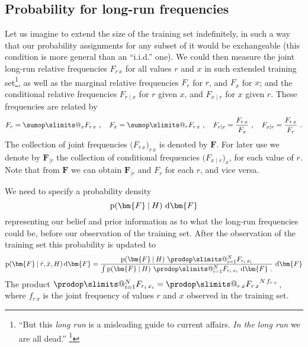 \documentclass[\ifafour a4paper,12pt,\else a5paper,10pt,\fi%
onecolumn,oneside,article,%
british%
]{memoir}
\makeatletter
\theoremstyle{remark}
\theoremstyle{innote}
\def\sum{\DOTSI\sumop\slimits@}
\def\prod{\DOTSI\prodop\slimits@}
\newcommand*{\citep}{\footcites}
\newcommand*{\di}{\mathrm{d}}%
\newcommand*{\p}{\mathrm{p}}%
\renewcommand*{\|}[1][]{\nonscript\:#1\vert\nonscript\:\mathopen{}}
\renewcommand*{\=}{\TextOrMath\texteq\eq}
\newcommand*{\sect}{\S}%
\newcommand*{\q}{}%
\DeclareRobustCommand*{\q}{%
  \mathord{\mathpalette\bigcdot@{}}%
}
\newcommand*{\bigcdot@scalefactor}{0.7}
\newcommand*{\bigcdot@widthfactor}{1.5}
\newcommand*{\bigcdot@}[2]{%
  \sbox0{$#1\vcenter{}$}%
  \sbox2{$#1\cdot\m@th$}%
  \hbox to \bigcdot@widthfactor\wd2{%
    \hfil
    \raise\ht0\hbox{%
      \scalebox{\bigcdot@scalefactor}{%
        \lower\ht0\hbox{$#1\bullet\m@th$}%
      }%
    }%
    \hfil
  }%
}
\newcommand*{\rd}{\bar{r}}
\newcommand*{\xd}{\bar{x}}
\newcommand*{\yF}{\bm{F}}
\newcommand*{\yFr}{\yF_{\bm{\mid}r}}
\makeatother
\begin{document}
\subsection{Probability for long-run frequencies}
\label{sec:prob_longrun}

Let us imagine to extend the size of the training set indefinitely, in such
a way that our probability assignments for any subset of it would be
exchangeable (this condition is more general than an \enquote{i.i.d.} one).
We could then measure the joint long-run relative frequencies $F_{r\,x}$
for all values $r$ and $x$ in such extended training
set\footnote{\enquote{But this \emph{long run} is a misleading guide to
    current affairs. \emph{In the long run} we are all dead.}
  \citep[\sect~3.I, p.~65]{keynes1923_r2013}}, as well as the marginal
relative frequencies $F_{r\q}$ for $r$, and $F_{\q x}$ for $x$; and the
conditional relative frequencies $F_{r\mid x}$ for $r$ given $x$, and
$F_{x \mid r}$ for $x$ given $r$. These frequencies are related by
\begin{equation}
  \label{eq:frequencies_relations}
  F_{r\q}=\sum_{x} F_{r\,x}\ , \quad
  F_{\q x}=\sum_{r} F_{r\,x}\ ,\quad
  F_{r\mid x}=\frac{F_{r\,x}}{F_{\q x}}\ , \quad
  F_{x\mid r}=\frac{F_{r\,x}}{F_{r\q}}\ .
\end{equation}
The collection of joint frequencies $\bigl(F_{r\,x}\bigr)_{r\,x}$ is
denoted by $\yF$. For later use we denote by $\yFr$ the collection of
conditional frequencies $\bigl(F_{x\mid r}\bigr)_{x}$, for each value of
$r$. Note that from $\yF$ we can obtain $\yFr$ and $F_{r\q}$ for each $r$,
and vice versa.

\medskip

We need to specify a probability density
\begin{equation}\label{eq:prior_F}
\p(\yF \| H)\ \di\yF
\end{equation}
representing our belief and prior information as to what the long-run
frequencies could be, before our observation of the training set. After the
observation of the training set this probability is updated to
\begin{equation}
  \label{eq:post_prob_F}
  \p(\yF\|\rd,\xd, H)\,\di\yF =
  \frac{\p(\yF\| H)\
    \prod_{i=1}^{N} F_{r_{i}\,x_{i}}
  }{\int \p(\yF\| H)\
    \prod_{i=1}^{N} F_{r_{i}\,x_{i}}
              \ \di\yF \ .
  }\ \di\yF
\end{equation}
The product $\prod_{i=1}^{N} F_{r_{i}\,x_{i}} = \prod_{r\,x} {F_{r\,x}}^{N\, f_{r\,x}}$,
where $f_{r\,x}$ is the joint frequency of values $r$ and $x$ observed in
the training set.
\end{document}
